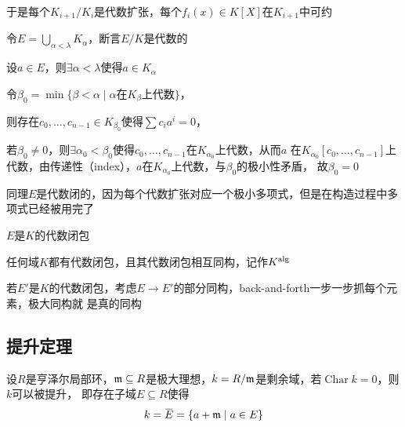 \documentclass[11pt]{article}
\DeclareMathOperator{\Char}{Char}
\begin{document}
于是每个\(K_{i+1}/K_i\)是代数扩张，每个\(f_i(x)\in K[X]\)在\(K_{i+1}\)中可约

令\(E=\bigcup_{\alpha<\lambda}K_\alpha\)，断言\(E/K\)是代数的

设\(a\in E\)，则\(\exists\alpha<\lambda\)使得\(a\in K_\alpha\)

令\(\beta_0=\min\{\beta<\alpha\mid\alpha\text{在$K_\beta$上代数}\}\)，

则存在\(c_0,\dots,c_{n-1}\in K_{\beta_0}\)使得\(\sum c_ia^i=0\)，

若\(\beta_0\neq 0\)，则\(\exists\alpha_0<\beta_0\)使得\(c_0,\dots,c_{n-1}\)在\(K_{\alpha_0}\)上代数，从而\(a\)
在\(K_{\alpha_0}[c_0,\dots,c_{n-1}]\)上代数，由传递性（index），\(a\)在\(K_{\alpha_0}\)上代数，与\(\beta_0\)的极小性矛盾，
故\(\beta_0=0\)

同理\(E\)是代数闭的，因为每个代数扩张对应一个极小多项式，但是在构造过程中多项式已经被用完了

\(E\)是\(K\)的代数闭包

\begin{proposition}[]
任何域\(K\)都有代数闭包，且其代数闭包相互同构，记作\(K^{\operatorname{\text{alg}}}\)
\end{proposition}

若\(E'\)是\(K\)的代数闭包，考虑\(E\to E'\)的部分同构，back-and-forth一步一步抓每个元素，极大同构就
是真的同构
\subsection{提升定理}
\label{sec:orgc7ef5f2}
设\(R\)是亨泽尔局部环，\(\mathfrak{m}\subseteq R\)是极大理想，\(k=R/\mathfrak{m}\)是剩余域，若\(\Char k=0\)，则\(k\)可以被提升，
即存在子域\(E\subseteq R\)使得
\begin{equation*}
k=\barE=\{a+\fm\mid a\in E\}
\end{equation*}
\end{document}
